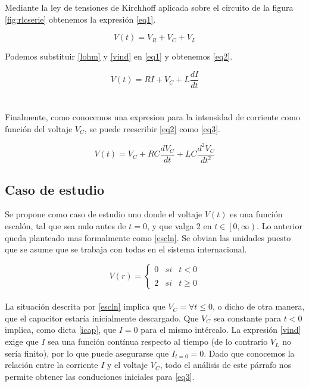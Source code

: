 \documentclass[letterpaper,12pt]{article} %
\begin{document}
Mediante la ley de tensiones de Kirchhoff aplicada sobre el circuito de la figura \ref{fig:rlcserie} obtenemos la expresión \eqref{eq1}.

\begin{equation}
V(t)=V_R+V_C+V_L
\label{eq1}
\end{equation}

Podemos substituir \eqref{lohm} y \eqref{vind} en \eqref{eq1} y obtenemos \eqref{eq2}.

\begin{equation}
V(t)=RI+V_C+L\frac{dI}{dt}
\label{eq2}
\end{equation}
\\ \\

Finalmente, como conocemos una expresion para la intensidad de corriente como función del voltaje $V_C$, se puede reescribir \eqref{eq2} como \eqref{eq3}.

\begin{equation}
V(t)=V_C + RC\frac{dV_C}{dt} + LC\frac{d^2V_C}{dt^2}
\label{eq3}
\end{equation}

\subsection*{Caso de estudio}

Se propone como caso de estudio uno donde el voltaje $V(t)$ es una función escalón, tal que sea nulo antes de $t=0$, y que valga $2$ en $t\in\left[0,\infty\right)$. Lo anterior queda planteado mas formalmente como \eqref{escln}. Se obvian las unidades puesto que se asume que se trabaja con todas en el sistema internacional.

\begin{equation}
V(r)= \left\{ \begin{array}{lcc}
            0 &   si  & t < 0 \\
            \\2 &   si  & t\geq 0
             \end{array}
   \right.
\label{escln}
\end{equation}
\\

La situación descrita por \eqref{escln} implica que $V_C= \forall  t\leq 0$, o dicho de otra manera, que el capacitor estaría inicialmente descargado. Que $V_C$ sea constante para $t<0$ implica, como dicta \eqref{icap}, que $I=0$ para el mismo intércalo. La expresión \eqref{vind} exige que $I$ sea una función contínua respecto al tiempo (de lo contrario $V_L$ no sería finito), por lo que puede asegurarse que $I_{t=0}=0$. Dado que conocemos la relación entre la corriente $I$ y el voltaje $V_C$, todo el análisis de este párrafo nos permite obtener las conduciones iniciales para \eqref{eq3}.\\ \\ 
\end{document}
